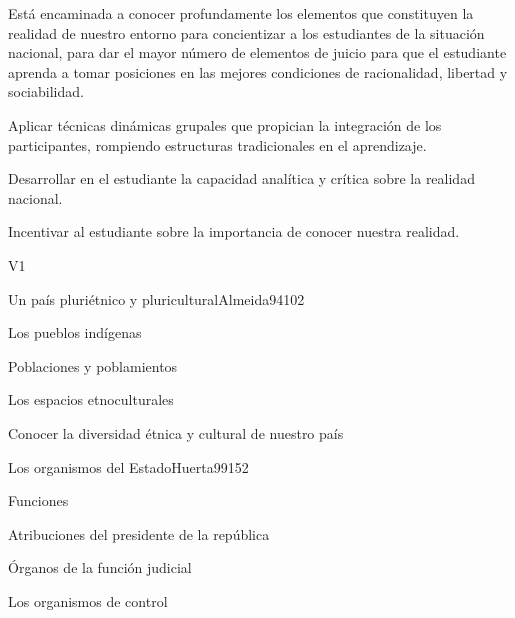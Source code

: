 \begin{syllabus}


\begin{justification}
Está encaminada a conocer profundamente los elementos que constituyen la realidad de 
nuestro entorno para concientizar a los estudiantes de la situación nacional, 
para dar el mayor número de elementos de juicio para que el estudiante aprenda a tomar 
posiciones en las mejores condiciones de racionalidad, libertad y sociabilidad.
\end{justification}

\begin{goals}
\item Aplicar técnicas dinámicas grupales que propician la integración de los participantes, rompiendo estructuras tradicionales en el aprendizaje.
\item Desarrollar en el estudiante la capacidad analítica y crítica sobre la realidad nacional.
\item Incentivar al estudiante sobre la importancia de conocer nuestra realidad.
\end{goals}

\begin{outcomes}{V1}
\end{outcomes}

\begin{unit}{Un país pluriétnico y pluricultural}{Almeida94}{10}{2}
   \begin{topics}
	\item Los pueblos indígenas
	\item Poblaciones y poblamientos
	\item Los espacios etnoculturales
   \end{topics}

   \begin{learningoutcomes}
      \item Conocer la diversidad étnica y cultural de nuestro país
   \end{learningoutcomes}
\end{unit}

\begin{unit}{Los organismos del Estado}{Huerta99}{15}{2}
   \begin{topics}
      \item Funciones
	\item Atribuciones del presidente de la república
	\item Órganos de la función judicial
	\item Los organismos de control
  \end{topics}


\end{unit}
\end{syllabus}
